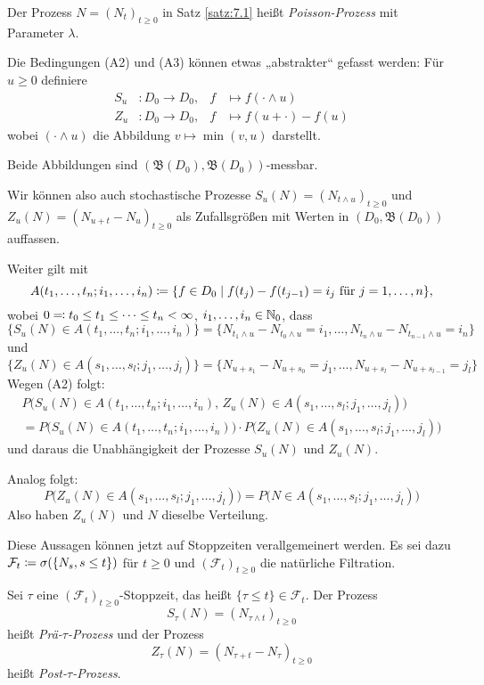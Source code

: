 \documentclass[a4paper,twoside,DIV15,BCOR12mm]{scrbook}
\newcommand{\cF}{\mathcal F}
\newcommand{\borel}{{\mathfrak B}}
\begin{document}
\begin{bemerkung}
Der Prozess $N=(N_t)_{t\ge 0}$ in Satz \ref{satz:7.1} heißt \emph{Poisson-Prozess} mit Parameter $\lambda$.
\end{bemerkung}

Die Bedingungen (A2) und (A3) können etwas „abstrakter“ gefasst werden: Für $u\ge 0$ definiere
\begin{align*}
S_u &: D_0 \to D_0,  & f &\mapsto f(\cdot\wedge u)\\
Z_u &: D_0 \to D_0,  & f &\mapsto f(u+\cdot)-f(u)
\end{align*}
wobei $(\cdot \wedge u)$ die Abbildung $v\mapsto \min (v,u)$ darstellt.

Beide Abbildungen sind $(\borel(D_0), \borel(D_0))$-messbar.

Wir können also auch stochastische Prozesse $S_u(N) = (N_{t\wedge u})_{t\ge 0}$ und $Z_u(N) = (N_{u+t} - N_u)_{t\ge 0}$ als Zufallsgrößen mit Werten in $(D_0,\borel(D_0))$ auffassen.

Weiter gilt mit 
\[
A(t_1,\ldots,t_n;i_1,\ldots,i_n) \da \{f\in D_0\mid f(t_j) - f(t_{j-1}) = i_j\text{ für }j=1,\ldots,n\},
\]
wobei $0 \ad t_0\le t_1\le \cdots\le t_n < \infty$, $i_1,\ldots,i_n\in\mathbb{N}_0$, dass
\[
\{S_u(N) \in A(t_1,\ldots,t_n;i_1,\ldots,i_n)\} 
= \{ N_{t_1\wedge u}- N_{t_0\wedge u} = i_1,\ldots,N_{t_n\wedge u}- N_{t_{n-1}\wedge u} = i_n\}
\]
und
\[
\{Z_u(N) \in A(s_1,\ldots,s_l;j_1,\ldots,j_l)\} 
= \{ N_{u+s_1}- N_{u+s_0} = j_1,\ldots,N_{u+s_l}- N_{u+s_{l-1}} = j_l\} 
\]
Wegen (A2) folgt:
\begin{multline*}
P\big(S_u(N) \in A(t_1,\ldots,t_n;i_1,\ldots,i_n),\,
 Z_u(N) \in A(s_1,\ldots,s_l;j_1,\ldots,j_l)\big) \\
= P\big(S_u(N) \in A(t_1,\ldots,t_n;i_1,\ldots,i_n)\big) 
\cdot P\big(Z_u(N) \in A(s_1,\ldots,s_l;j_1,\ldots,j_l)\big) 
\end{multline*}
und daraus die Unabhängigkeit der Prozesse $S_u(N)$ und $Z_u(N)$.

Analog folgt:
\[
P\big(Z_u(N) \in A(s_1,\ldots,s_l;j_1,\ldots,j_l)\big) 
= P\big( N \in A(s_1,\ldots,s_l;j_1,\ldots,j_l)\big)
\]
Also haben $Z_u(N)$ und $N$ dieselbe Verteilung.

Diese Aussagen können jetzt auf Stoppzeiten verallgemeinert werden. Es sei dazu $\cF_t \da \sigma(\{N_s, s\le t\})$ für $t\ge 0$ und $(\cF_t)_{t\ge 0}$ die natürliche Filtration.

\begin{definition}
Sei $\tau$ eine $(\cF_t)_{t\ge 0}$-Stoppzeit, das heißt $\{\tau \le t \} \in \cF_t$. Der Prozess 
\[
S_\tau(N) = (N_{\tau \wedge t})_{t\ge 0}
\]
heißt \emph{Prä-$\tau$-Prozess} und der Prozess 
\[
Z_\tau(N) = (N_{\tau + t} - N_\tau)_{t \ge 0}
\]
heißt \emph{Post-$\tau$-Prozess}.
\end{definition}
\end{document}
